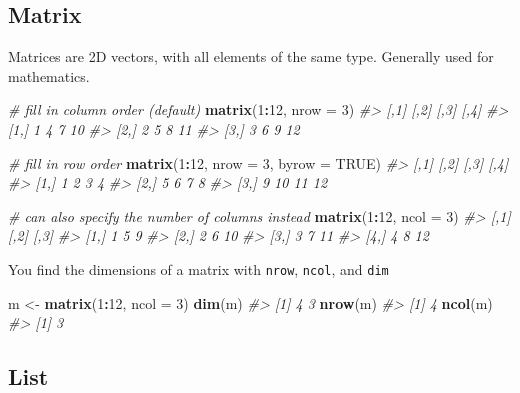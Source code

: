 \documentclass[]{book}
\newenvironment{Shaded}{\begin{snugshade}}{\end{snugshade}}
\newcommand{\KeywordTok}[1]{\textcolor[rgb]{0.13,0.29,0.53}{\textbf{#1}}}
\newcommand{\DataTypeTok}[1]{\textcolor[rgb]{0.13,0.29,0.53}{#1}}
\newcommand{\DecValTok}[1]{\textcolor[rgb]{0.00,0.00,0.81}{#1}}
\newcommand{\StringTok}[1]{\textcolor[rgb]{0.31,0.60,0.02}{#1}}
\newcommand{\CommentTok}[1]{\textcolor[rgb]{0.56,0.35,0.01}{\textit{#1}}}
\newcommand{\OtherTok}[1]{\textcolor[rgb]{0.56,0.35,0.01}{#1}}
\newcommand{\OperatorTok}[1]{\textcolor[rgb]{0.81,0.36,0.00}{\textbf{#1}}}
\newcommand{\NormalTok}[1]{#1}
\theoremstyle{definition}
\theoremstyle{definition}
\theoremstyle{definition}
\theoremstyle{remark}
\begin{document}
\subsection{Matrix}\label{matrix}

Matrices are 2D vectors, with all elements of the same type. Generally
used for mathematics.

\begin{Shaded}
\begin{Highlighting}[]
\CommentTok{# fill in column order (default)}
\KeywordTok{matrix}\NormalTok{(}\DecValTok{1}\OperatorTok{:}\DecValTok{12}\NormalTok{, }\DataTypeTok{nrow =} \DecValTok{3}\NormalTok{)}
\CommentTok{#>      [,1] [,2] [,3] [,4]}
\CommentTok{#> [1,]    1    4    7   10}
\CommentTok{#> [2,]    2    5    8   11}
\CommentTok{#> [3,]    3    6    9   12}

\CommentTok{# fill in row order}
\KeywordTok{matrix}\NormalTok{(}\DecValTok{1}\OperatorTok{:}\DecValTok{12}\NormalTok{, }\DataTypeTok{nrow =} \DecValTok{3}\NormalTok{, }\DataTypeTok{byrow =} \OtherTok{TRUE}\NormalTok{)}
\CommentTok{#>      [,1] [,2] [,3] [,4]}
\CommentTok{#> [1,]    1    2    3    4}
\CommentTok{#> [2,]    5    6    7    8}
\CommentTok{#> [3,]    9   10   11   12}

\CommentTok{# can also specify the number of columns instead}
\KeywordTok{matrix}\NormalTok{(}\DecValTok{1}\OperatorTok{:}\DecValTok{12}\NormalTok{, }\DataTypeTok{ncol =} \DecValTok{3}\NormalTok{)}
\CommentTok{#>      [,1] [,2] [,3]}
\CommentTok{#> [1,]    1    5    9}
\CommentTok{#> [2,]    2    6   10}
\CommentTok{#> [3,]    3    7   11}
\CommentTok{#> [4,]    4    8   12}
\end{Highlighting}
\end{Shaded}

You find the dimensions of a matrix with \texttt{nrow}, \texttt{ncol},
and \texttt{dim}

\begin{Shaded}
\begin{Highlighting}[]
\NormalTok{m <-}\StringTok{ }\KeywordTok{matrix}\NormalTok{(}\DecValTok{1}\OperatorTok{:}\DecValTok{12}\NormalTok{, }\DataTypeTok{ncol =} \DecValTok{3}\NormalTok{)}
\KeywordTok{dim}\NormalTok{(m)}
\CommentTok{#> [1] 4 3}
\KeywordTok{nrow}\NormalTok{(m)}
\CommentTok{#> [1] 4}
\KeywordTok{ncol}\NormalTok{(m)}
\CommentTok{#> [1] 3}
\end{Highlighting}
\end{Shaded}

\subsection{List}\label{list}
\end{document}
